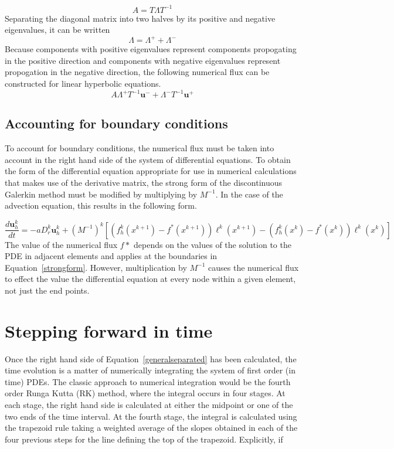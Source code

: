 \documentclass{article}
\begin{document}
\begin{equation}
A=T\Lambda T^{-1}
\end{equation}
Separating the diagonal matrix into two halves by its positive and negative eigenvalues, it can be written
\begin{equation}
\Lambda=\Lambda^++\Lambda^-
\end{equation}
Because components with positive eigenvalues represent components
propogating in the positive direction and components with negative
eigenvalues represent propogation in the negative direction, the
following numerical flux can be constructed for linear hyperbolic equations.
\begin{equation}
A\Lambda^+T^{-1}\boldsymbol{u}^-+\Lambda^-T^{-1}\boldsymbol{u}^+
\end{equation}

\subsection{Accounting for boundary conditions}

To account for boundary conditions, the numerical flux must be taken
into account in the right hand side of the system of differential
equations. To obtain the form of the differential equation appropriate
for use in numerical calculations that makes use of the derivative
matrix, the strong form of the discontinuous Galerkin method must be
modified by multiplying by $M^{-1}$. In the
case of the advection equation, this results in the following form.

\begin{equation}
\frac{d\boldsymbol{u}_h^k}{dt}=-aD_r^k\boldsymbol{u}^k_h+
(M^{-1})^k[(f^k_h(x^{k+1})-f^*(x^{k+1}))\ell^k(x^{k+1})
-(f_h^k(x^k)-f^*(x^k))\ell^k(x^k)]
\end{equation}
The value of the numerical flux $f*$ depends on the values of the
solution to the PDE in adjacent elements and applies at the boundaries
in Equation~\ref{strongform}. However, multiplication by $M^{-1}$
causes the numerical flux to effect the value the differential
equation at every node within a given element, not just the end
points.


\section{Stepping forward in time}
Once the right hand side of Equation~\ref{generalseparated} has been
calculated, the time evolution is a matter of numerically integrating
the system of first order (in time) PDEs. The classic approach to
numerical integration would be the fourth order Runga Kutta (RK)
method, where the integral occurs in four stages. At each stage, the
right hand side is calculated at either the midpoint or one of the two
ends of the time interval. At the fourth stage, the integral is
calculated using the trapezoid rule taking a weighted average of the
slopes obtained in each of the four previous steps for the line
defining the top of the trapezoid. Explicitly, if
\end{document}
